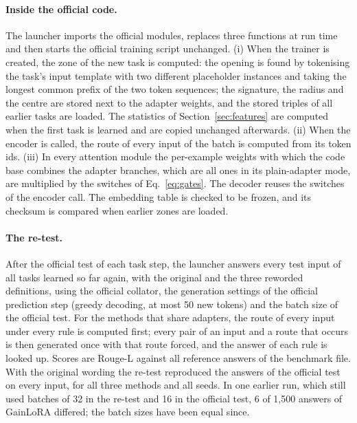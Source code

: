 \paragraph{Inside the official code.} The launcher imports the official modules, replaces three
functions at run time and then starts the official training script unchanged. (i) When the trainer
is created, the zone of the new task is computed: the opening is found by tokenising the task's
input template with two different placeholder instances and taking the longest common prefix of the
two token sequences; the signature, the radius and the centre are stored next to the adapter
weights, and the stored triples of all earlier tasks are loaded. The statistics of
Section~\ref{sec:features} are computed when the first task is learned and are copied unchanged
afterwards. (ii) When the encoder is called, the route of every input of the batch is computed
from its token ids. (iii) In every attention module the per-example weights with which the code
base combines the adapter branches, which are all ones in its plain-adapter mode, are multiplied by
the switches of Eq.~\eqref{eq:gates}. The decoder reuses the switches of the encoder call. The
embedding table is checked to be frozen, and its checksum is compared when earlier zones are loaded.

\paragraph{The re-test.} After the official test of each task step, the launcher answers every test
input of all tasks learned so far again, with the original and the three reworded definitions,
using the official collator, the generation settings of the official prediction step (greedy
decoding, at most 50 new tokens) and the batch size of the official test. For the methods that
share adapters, the route of every input under every rule is computed first; every pair of an input
and a route that occurs is then generated once with that route forced, and the answer of each rule
is looked up. Scores are Rouge-L against all reference answers of the benchmark file. With the
original wording the re-test reproduced the answers of the official test on every input, for all
three methods and all seeds. In one earlier run, which still used batches of 32 in the re-test and
16 in the official test, 6 of 1{,}500 answers of GainLoRA differed; the batch sizes have been equal
since.

